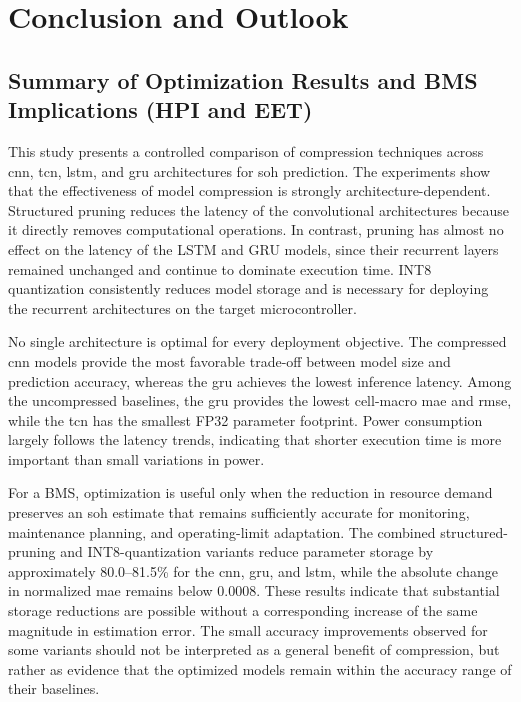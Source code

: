 \documentclass[final,3p,times]{elsarticle}
\begin{document}
\section{Conclusion and Outlook}

\subsection{Summary of Optimization Results and BMS Implications (HPI and EET)}

This study presents a controlled comparison of compression techniques across \ac{cnn}, \ac{tcn}, \ac{lstm}, and \ac{gru} architectures for \ac{soh} prediction. The experiments show that the effectiveness of model compression is strongly architecture-dependent. Structured pruning reduces the latency of the convolutional architectures because it directly removes computational
operations. In contrast, pruning has almost no effect on the latency of the
LSTM and GRU models, since their recurrent layers remained unchanged and
continue to dominate execution time. INT8 quantization consistently reduces
model storage and is necessary for deploying the recurrent architectures on
the target microcontroller.

No single architecture is optimal for every deployment objective. The
compressed \ac{cnn} models provide the most favorable trade-off between model size
and prediction accuracy, whereas the \ac{gru} achieves the lowest inference
latency. Among the uncompressed baselines, the \ac{gru} provides the lowest cell-macro \ac{mae} and \ac{rmse}, while the \ac{tcn} has the smallest FP32 parameter footprint. Power consumption largely
follows the latency trends, indicating that shorter execution time is more
important than small variations in power.

For a BMS, optimization is useful only when the reduction in resource demand preserves an \ac{soh} estimate that remains sufficiently accurate for monitoring, maintenance planning, and operating-limit adaptation. The combined structured-pruning and INT8-quantization variants reduce parameter storage by approximately 80.0--81.5\% for the \ac{cnn}, \ac{gru}, and \ac{lstm}, while the absolute change in normalized \ac{mae} remains below 0.0008. These results indicate that substantial storage reductions are possible without a corresponding increase of the same magnitude in estimation error. The small accuracy improvements observed for some variants should not be interpreted as a general benefit of compression, but rather as evidence that the optimized models remain within the accuracy range of their baselines.
\end{document}
